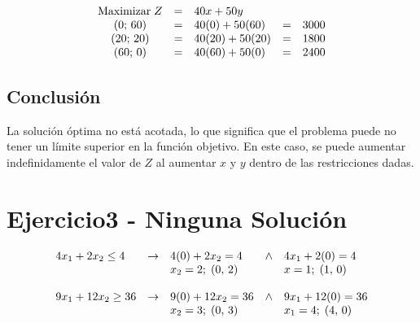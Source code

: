 \documentclass[12pt]{article}
\begin{document}
\centering
{}

\[
\begin{array}{c c l c l}
\text{Maximizar}\;Z & = & 40x + 50y       &   &     \\
(0;\, 60)          & = & 40(0) + 50(60) & = & 3000 \\
(20;\, 20)        & = & 40(20) + 50(20) & = & 1800 \\
(60;\, 0)        & = & 40(60) + 50(0) & = & 2400 \\
\end{array}
\]

\subsection*{Conclusión}
La solución óptima no está acotada, lo que significa que el problema puede no tener un límite superior en la función objetivo. En este caso, se puede aumentar indefinidamente el valor de \(Z\) al aumentar \(x\) y \(y\) dentro de las restricciones dadas.







\newpage
\section*{Ejercicio3 - Ninguna Solución}
\[
\begin{array}{l l l l l l l}
  4x_1 + 2x_2 \leq 4 & \rightarrow & 4(0) + 2x_2 = 4        & \wedge & 4x_1 + 2(0) = 4   \\
                      &             & x_2 = 2;\; (0,\,2)  &        & x = 1;\; (1,\,0)   \\
                      &             &                         &        &                    \\
  9x_1 + 12x_2 \geq 36 & \rightarrow & 9(0) + 12x_2 = 36        & \wedge & 9x_1 + 12(0) = 36   \\
                      &             & x_2 = 3;\; (0,\,3)      &        & x_1 = 4;\; (4,\,0) \\
\end{array}
\]
\end{document}
